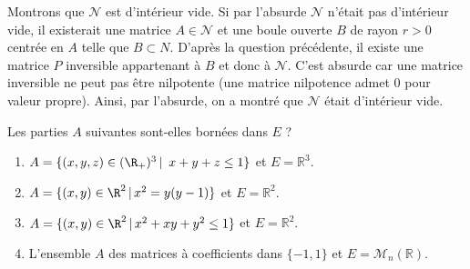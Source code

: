 \documentclass[a4paper,10pt]{report}
\begin{document}
\begin{enumerate}
\begin{enumerate}
\medskip

\noindent Montrons que $\mathcal{N}$ est d'intérieur vide. Si par l'absurde $\mathcal{N}$ n'était pas d'intérieur vide, il existerait une matrice $A \in \mathcal{N}$ et une boule ouverte $B$ de rayon $r>0$ centrée en $A$ telle que $B \subset N$. D'après la question précédente, il existe une matrice $P$ inversible appartenant à $B$ et donc à $\mathcal{N}$. C'est absurde car une matrice inversible ne peut pas être nilpotente (une matrice nilpotence admet $0$ pour valeur propre). Ainsi, par l'absurde, on a montré que $\mathcal{N}$ était d'intérieur vide.
\end{enumerate}
\end{enumerate}

\begin{Exercice}{} Les parties $A$ suivantes sont-elles bornées dans $E$ ?

\begin{enumerate}
\item $A= \lbrace (x,y,z)\in (\R_+)^3 \, \vert \,  \ x+y+z\leq 1\rbrace$ et $E= \mathbb{R}^3$.
\item $A = \lbrace (x,y)\in\R^2 \, \vert \, x^2=y(y-1) \rbrace$ et $E= \mathbb{R}^2$.
\item $A = \lbrace (x,y)\in\R^2 \, \vert \, x^2+xy+y^2\leq1 \rbrace$ et $E= \mathbb{R}^2$.
\item L'ensemble $A$ des matrices à coefficients dans $\lbrace -1,1 \rbrace$ et $E = \mathcal{M}_n(\mathbb{R})$.
\end{enumerate}
\end{Exercice}
\end{document}
